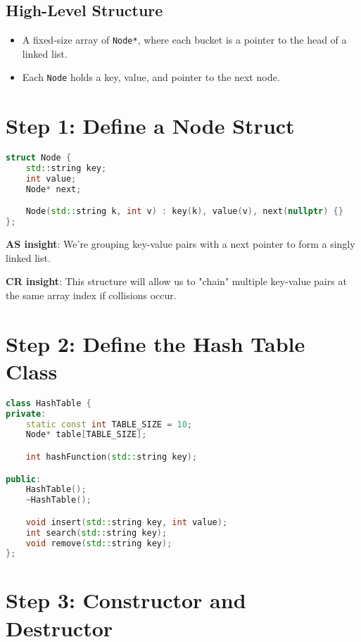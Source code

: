 \documentclass{article}
\begin{document}
\subsection*{High-Level Structure}

\begin{itemize}
    \item A fixed-size array of \texttt{Node*}, where each bucket is a pointer to the head of a linked list.
    \item Each \texttt{Node} holds a key, value, and pointer to the next node.
\end{itemize}

\section*{Step 1: Define a Node Struct}

\begin{lstlisting}[language=C++, caption={Struct for Linked List Node}]
struct Node {
    std::string key;
    int value;
    Node* next;

    Node(std::string k, int v) : key(k), value(v), next(nullptr) {}
};
\end{lstlisting}

\textbf{AS insight}: We're grouping key-value pairs with a next pointer to form a singly linked list.

\textbf{CR insight}: This structure will allow us to "chain" multiple key-value pairs at the same array index if collisions occur.

\section*{Step 2: Define the Hash Table Class}

\begin{lstlisting}[language=C++, caption={Basic Hash Table Class Skeleton}]
class HashTable {
private:
    static const int TABLE_SIZE = 10;
    Node* table[TABLE_SIZE];

    int hashFunction(std::string key);

public:
    HashTable();
    ~HashTable();

    void insert(std::string key, int value);
    int search(std::string key);
    void remove(std::string key);
};
\end{lstlisting}

\section*{Step 3: Constructor and Destructor}
\end{document}
